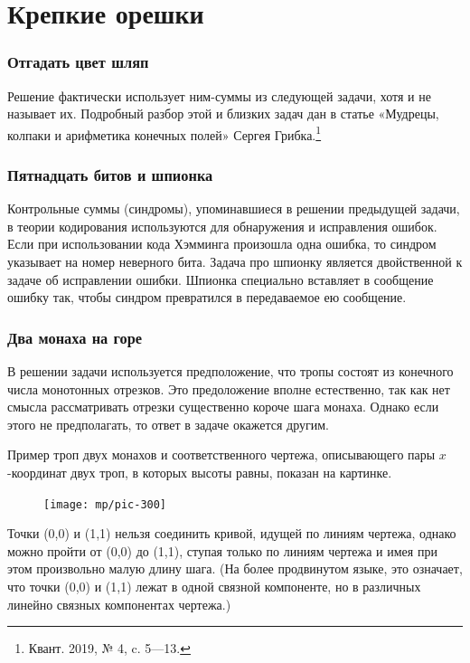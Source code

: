 \documentclass[twoside]{book}
\begin{document}
\section{Крепкие орешки}

\subsubsection*{Отгадать цвет шляп}
Решение фактически использует ним-суммы из следующей задачи, хотя и не называет их.
Подробный разбор этой и близких задач дан в статье «Мудрецы, колпаки и арифметика конечных полей» Сергея Грибка.\footnote{Квант. 2019, № 4, c. 5—13.}

\subsubsection{Пятнадцать битов и шпионка}
Контрольные суммы (синдромы), упоминавшиеся  в решении предыдущей задачи, в теории кодирования используются для обнаружения и исправления ошибок.
Если при использовании кода Хэмминга произошла одна ошибка, то синдром указывает на номер неверного бита.
Задача про шпионку является двойственной к задаче об исправлении ошибки.
Шпионка специально вставляет в сообщение ошибку так, чтобы синдром превратился в передаваемое ею сообщение.

\subsubsection{Два монаха на горе}
В решении задачи используется предположение, что тропы состоят из конечного числа монотонных отрезков.
Это предоложение вполне естественно, так как нет смысла рассматривать отрезки существенно короче шага монаха.
Однако если этого не предполагать, то ответ в задаче окажется другим.

Пример троп двух монахов и соответственного чертежа, описывающего пары $x$-координат двух троп, в которых высоты равны, показан на картинке.
\begin{figure}[ht!]
\vskip-0mm
\centering
\texttt{[image: mp/pic-300]}
\end{figure}
Точки (0,0) и (1,1) нельзя соединить кривой, идущей по линиям чертежа, 
однако можно пройти от (0,0) до (1,1), ступая только по линиям чертежа и имея при этом произвольно малую длину шага.
(На более продвинутом языке, это означает, что точки (0,0) и (1,1) лежат в одной связной компоненте, но в различных линейно связных компонентах чертежа.)
\end{document}
